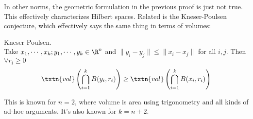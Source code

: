 \begin{rem}
In other norms, the geometric formulation in the previous proof is just not true. This effectively characterizes Hilbert spaces.
Related is the Kneser-Poulsen conjecture, which effectively says the same thing in terms of volumes:
\begin{conj} Kneser-Poulsen. \\
Take $x_1, \cdots, x_k; y_1, \cdots, y_k \in \R^n$ and $\|y_i - y_j\| \leq \|x_i - x_j\|$ for all $i, j$. Then $\forall r_i \geq 0$
\[
\txtn{vol}\left(\bigcap_{i = 1}^k B(y_i, r_i) \right) \geq \txtn{vol}\left(\bigcap_{i = 1}^k B(x_i, r_i)\right)
\]
\end{conj}
This is known for $n = 2$, where volume is area using trigonometry and all kinds of ad-hoc arguments. It's also known for $k = n+2$. 
\end{rem}





